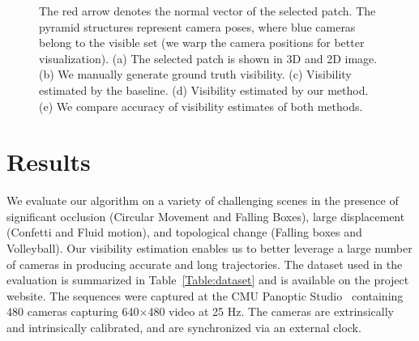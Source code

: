 \begin{figure}[t]
	\caption{The red arrow denotes the normal vector of the selected patch. The pyramid structures represent camera poses, where blue cameras belong to the visible set (we warp the camera positions for better visualization). (a) The selected patch is shown in 3D and 2D image. (b) We manually generate ground truth visibility. (c) Visibility estimated by the baseline. (d) Visibility estimated by our method. (e) We compare accuracy of visibility estimates of both methods.} 
	\label{Fig:visibilityError}
\end{figure}

\section{Results}






We evaluate our algorithm on a variety of challenging scenes in the presence of significant occlusion (Circular Movement and Falling Boxes), large displacement (Confetti and Fluid motion), and topological change (Falling boxes and Volleyball). Our visibility estimation enables us to better leverage a large number of cameras in producing accurate and long trajectories. The dataset used in the evaluation is summarized in Table~\ref{Table:dataset} and is available on the project website. The sequences were captured at the CMU Panoptic Studio~\cite{PanopticStudio2014} containing 480 cameras capturing 640$\times$480 video at 25 Hz. The cameras are extrinsically and intrinsically calibrated, and are synchronized via an external clock.


\begin{table} [t]

\centering
\caption{Summary of the datasets.}\label{Table:dataset}
\end{table}


